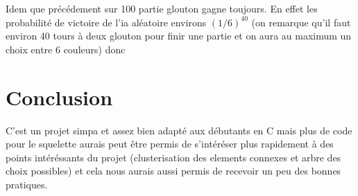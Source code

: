 \documentclass[a4paper,11pt]{article}
\begin{document}
Idem que précédement sur 100 partie glouton gagne toujours. En effet les probabilité de victoire de l'ia aléatoire environs ${(1/6)}^{40}$ (on remarque qu'il faut environ 40 tours à deux glouton pour finir une partie et on aura au maximum un choix entre 6 couleurs) donc

\section{Conclusion}

C'est un projet simpa et assez bien adapté aux débutants en C mais plus de code pour le squelette aurais peut être permis de s'intéréser plus rapidement à des points intéréssants du projet (clusterisation des elements connexes et arbre des choix possibles) et cela nous aurais aussi permis de recevoir un peu des bonnes pratiques.
\end{document}
